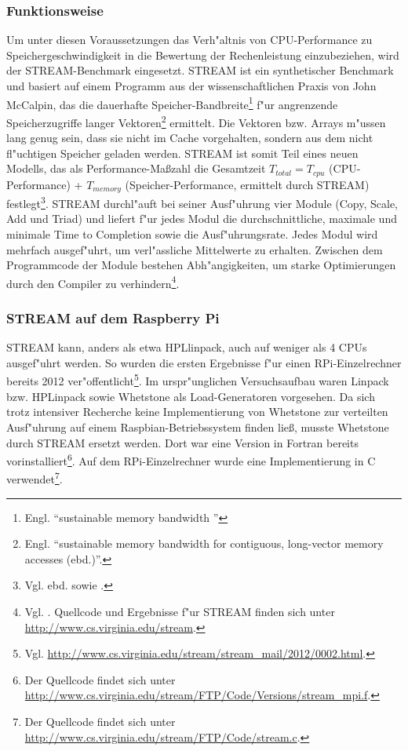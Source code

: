 \subsubsection{Funktionsweise}\label{Funktionsweise STREAM}

Um unter diesen Voraussetzungen das Verh"altnis von CPU-Performance zu Speichergeschwindigkeit in die Bewertung der Rechenleistung einzubeziehen, wird der STREAM-Bench\-mark eingesetzt. STREAM ist ein synthetischer Benchmark und basiert auf einem Programm aus der wissenschaftlichen Praxis von John McCalpin, das die dauerhafte Speicher-Bandbreite\footnote{Engl. "`sustainable memory bandwidth \cite{mcc95}"'} f"ur angrenzende Speicherzugriffe langer Vektoren\footnote{Engl. "`sustainable memory bandwidth for contiguous, long-vector memory accesses (ebd.)"'.} ermittelt. Die Vektoren bzw. Arrays m"ussen lang genug sein, dass sie nicht im Cache vorgehalten, sondern aus dem nicht fl"uchtigen Speicher geladen werden. STREAM ist somit Teil eines neuen Modells, das als Performance-Ma\ss zahl die Gesamtzeit $T_{total} = T_{cpu}$ (CPU-Performance) + $T_{memory}$ (Speicher-Performance, ermittelt durch STREAM) festlegt\footnote{Vgl. ebd. sowie \cite{mcc05}.}. 
\enlargethispage*{2cm}
STREAM durchl"auft bei seiner Ausf"uhrung vier Module (Copy, Scale, Add und Triad) und liefert f"ur jedes Modul die durchschnittliche, maximale und minimale Time to Completion sowie die Ausf"uhrungsrate. Jedes Modul wird mehrfach ausgef"uhrt, um verl"assliche Mittelwerte zu erhalten. Zwischen dem Programmcode der Module bestehen Abh"angigkeiten, um starke Optimierungen durch den Compiler zu verhindern\footnote{Vgl. \cite{mcc05}. Quellcode und Ergebnisse f"ur STREAM finden sich unter \url{http://www.cs.virginia.edu/stream}.}.   

\subsubsection{STREAM auf dem Raspberry Pi}\label{STREAM RPi}

STREAM kann, anders als etwa HPLlinpack, auch auf weniger als 4 CPUs ausgef"uhrt werden. So wurden die ersten Ergebnisse f"ur einen RPi-Einzelrechner bereits 2012 ver"offentlicht\footnote{Vgl. \url{http://www.cs.virginia.edu/stream/stream_mail/2012/0002.html}.}. Im urspr"unglichen Versuchsaufbau waren Linpack bzw. HPLinpack sowie Whetstone als Load-Generatoren vorgesehen. Da sich trotz intensiver Recherche keine Implementierung von Whetstone zur verteilten Ausf"uhrung auf einem Raspbian-Betriebssystem finden lie\ss, musste Whetstone durch STREAM ersetzt werden. Dort war eine Version in Fortran bereits vorinstalliert\footnote{Der Quellcode findet sich unter \mbox{\url{http://www.cs.virginia.edu/stream/FTP/Code/Versions/stream_mpi.f}.}}. Auf dem RPi-Einzelrechner wurde eine Implementierung in C verwendet\footnote{Der Quellcode findet sich unter \url{http://www.cs.virginia.edu/stream/FTP/Code/stream.c}.}.  


